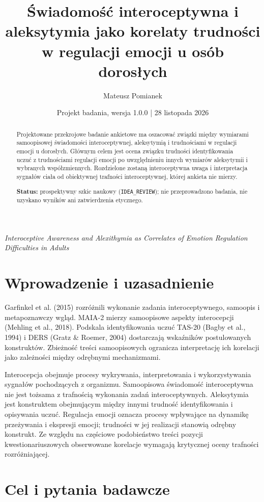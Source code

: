 \documentclass[11pt,a4paper]{article}
\title{Świadomość interoceptywna i aleksytymia jako korelaty trudności w regulacji emocji u osób dorosłych}
\author{Mateusz Pomianek}
\date{Projekt badania, wersja 1.0.0  | 28 listopada 2026}
\begin{document}
\maketitle
\begin{center}
\textit{Interoceptive Awareness and Alexithymia as Correlates of Emotion Regulation Difficulties in Adults}
\end{center}
\begin{abstract}
Projektowane przekrojowe badanie ankietowe ma oszacować związki między wymiarami samoopisowej świadomości interoceptywnej, aleksytymią i trudnościami w regulacji emocji u dorosłych. Głównym celem jest ocena związku trudności identyfikowania uczuć z trudnościami regulacji emocji po uwzględnieniu innych wymiarów aleksytymii i wybranych współzmiennych. Rozdzielone zostaną interoceptywna uwaga i interpretacja sygnałów ciała od obiektywnej trafności interoceptywnej, której ankieta nie mierzy.

\textbf{Status:} prospektywny szkic naukowy (\texttt{IDEA\_REVIEW}); nie przeprowadzono badania, nie uzyskano wyników ani zatwierdzenia etycznego.
\end{abstract}
\tableofcontents
\section{Wprowadzenie i uzasadnienie}

Garfinkel et al. (2015) rozróżnili wykonanie zadania interoceptywnego, samoopis i metapoznawczy wgląd. MAIA-2 mierzy samoopisowe aspekty interocepcji (Mehling et al., 2018). Podskala identyfikowania uczuć TAS-20 (Bagby et al., 1994) i DERS (Gratz \& Roemer, 2004) dostarczają wskaźników postulowanych konstruktów. Zbieżność treści samoopisowych ogranicza interpretację ich korelacji jako zależności między odrębnymi mechanizmami.

Interocepcja obejmuje procesy wykrywania, interpretowania i wykorzystywania sygnałów pochodzących z organizmu. Samoopisowa świadomość interoceptywna nie jest tożsama z trafnością wykonania zadań interoceptywnych. Aleksytymia jest konstruktem obejmującym między innymi trudność identyfikowania i opisywania uczuć. Regulacja emocji oznacza procesy wpływające na dynamikę przeżywania i ekspresji emocji; trudności w jej realizacji stanowią odrębny konstrukt. Ze względu na częściowe podobieństwo treści pozycji kwestionariuszowych obserwowane korelacje wymagają krytycznej oceny trafności rozróżniającej.
\section{Cel i pytania badawcze}
\end{document}
